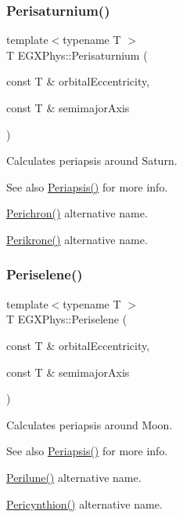\subsubsection{\texorpdfstring{Perisaturnium()}{Perisaturnium()}}
{\footnotesize\ttfamily template$<$typename T $>$ \\
T E\+G\+X\+Phys\+::\+Perisaturnium (\begin{DoxyParamCaption}\item[{const T \&}]{orbital\+Eccentricity,  }\item[{const T \&}]{semimajor\+Axis }\end{DoxyParamCaption})}



Calculates periapsis around Saturn. 

\begin{DoxySeeAlso}{See also}
\mbox{\hyperlink{group___periapsis_ga4414ac75539371ec874a3d25cad6c9fe}{Periapsis()}} for more info. 

\mbox{\hyperlink{group___periapsis_ga12b5e99aa2e3e7031ef6ce93060cf516}{Perichron()}} alternative name. 

\mbox{\hyperlink{group___periapsis_gaa56f74c44a3583b8f0d13b821c1d7422}{Perikrone()}} alternative name. 
\end{DoxySeeAlso}
\mbox{\label{group___periapsis_ga255874374dde571531e443cdbef9ef0c}} 
\subsubsection{\texorpdfstring{Periselene()}{Periselene()}}
{\footnotesize\ttfamily template$<$typename T $>$ \\
T E\+G\+X\+Phys\+::\+Periselene (\begin{DoxyParamCaption}\item[{const T \&}]{orbital\+Eccentricity,  }\item[{const T \&}]{semimajor\+Axis }\end{DoxyParamCaption})}



Calculates periapsis around Moon. 

\begin{DoxySeeAlso}{See also}
\mbox{\hyperlink{group___periapsis_ga4414ac75539371ec874a3d25cad6c9fe}{Periapsis()}} for more info. 

\mbox{\hyperlink{group___periapsis_ga2cc7ab05e18d32c94d8d74972e032793}{Perilune()}} alternative name. 

\mbox{\hyperlink{group___periapsis_gaeeba153b188cd06cbd233eaef12f0a6a}{Pericynthion()}} alternative name. 
\end{DoxySeeAlso}
\mbox{\label{group___periapsis_gab8b8131a617dd2d2a4de1d48accd7442}} 
